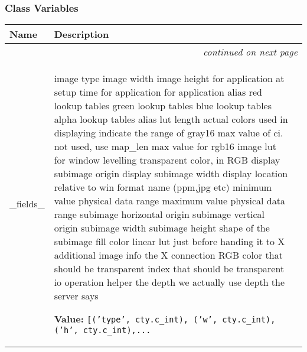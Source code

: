 
  \subsubsection{Class Variables}

    \vspace{-1cm}
\hspace{\varindent}\begin{longtable}{|p{\varnamewidth}|p{\vardescrwidth}|l}
\cline{1-2}
\cline{1-2} \centering \textbf{Name} & \centering \textbf{Description}& \\
\cline{1-2}
\endhead\cline{1-2}\multicolumn{3}{r}{\small\textit{continued on next page}}\\\endfoot\cline{1-2}
\endlastfoot\raggedright \_\-f\-i\-e\-l\-d\-s\-\_\- & \raggedright image type
image width
image height
for application at setup time
for application
for application
alias
red lookup tables
green lookup tables
blue lookup tables
alpha lookup tables
alias
lut length
actual colors used in displaying
indicate the range of gray16
max value of ci. not used, use map\_len
max value for rgb16 image
lut for window levelling
transparent color, in RGB
display subimage origin
display subimage width
display location relative to win
format name (ppm,jpg etc)
minimum value physical data range
maximum value physical data range
subimage horizontal origin
subimage vertical origin
subimage width
subimage height
shape of the subimage
fill color
linear lut
just before handing it to X
additional image info
the X connection
RGB color that should be transparent
index that should be transparent
io operation helper
the depth we actually use
depth the server says

\textbf{Value:} 
{\tt [('type', cty.c\_int), ('w', cty.c\_int), ('h', cty.c\_int),\texttt{...}}&\\
\cline{1-2}
\end{longtable}



